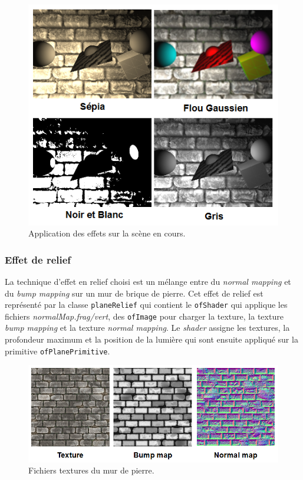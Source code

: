 \begin{figure}[H]
    \centering
	\includegraphics[scale=1]{img/infog-image-effet-plein-ecran.png}
	\caption{Application des effets sur la scène en cours.}
	\label{fig:effects}
\end{figure}


\subsubsection{Effet de relief}
\label{s:relief}
La technique d'effet en relief choisi est un mélange entre du \textit{normal mapping} et du \textit{bump mapping} sur un mur de brique de pierre. Cet effet de relief est représenté par la classe \texttt{planeRelief} qui contient le \texttt{ofShader} qui applique les fichiers \textit{normalMap.frag/vert}, des \texttt{ofImage} pour charger la texture, la texture \textit{bump mapping} et la texture \textit{normal mapping}. Le \textit{shader} assigne les textures, la profondeur maximum et la position de la lumière qui sont ensuite appliqué sur la primitive \texttt{ofPlanePrimitive}.

\begin{figure}[H]
    \centering
	\includegraphics[scale=0.8]{img/infog-image-mur-pierre.png}
	\caption{Fichiers textures du mur de pierre.}
	\label{fig:wallfiles}
\end{figure}

